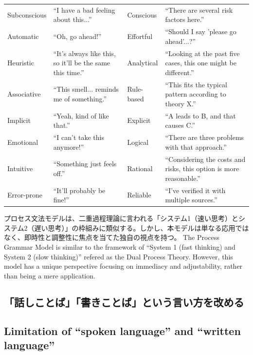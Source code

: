 \documentclass[a4paper]{article}
\begin{document}
\begin{table}[htb]
\begin{tabular}{@{}
>{\raggedright\arraybackslash}p{20mm}
>{\raggedright\arraybackslash}p{42mm}
>{\raggedright\arraybackslash}p{20mm}
>{\raggedright\arraybackslash}p{58mm}
@{}
}
Subconscious & ``I have a bad feeling about this...'' &
Conscious & ``There are several risk factors here.'' \\

Automatic & ``Oh, go ahead!'' &
Effortful & ``Should I say 'please go ahead'...?'' \\

Heuristic & ``It's always like this, so it'll be the same this time.'' &
Analytical & ``Looking at the past five cases, this one might be different.'' \\

Associative & ``This smell... reminds me of something.'' &
Rule-based & ``This fits the typical pattern according to theory X.'' \\

Implicit & ``Yeah, kind of like that.'' &
Explicit & ``A leads to B, and that causes C.'' \\

Emotional & ``I can't take this anymore!'' &
Logical & ``There are three problems with that approach.'' \\

Intuitive & ``Something just feels off.'' &
Rational & ``Considering the costs and risks, this option is more reasonable.'' \\

Error-prone & ``It'll probably be fine!'' &
Reliable & ``I've verified it with multiple sources.'' \\
\end{tabular}
\fi
\end{table}

\ifJPN
プロセス文法モデルは、二重過程理論に言われる「システム1（速い思考）とシステム2（遅い思考）」の枠組みに類似する。しかし、本モデルは単なる応用ではなく、即時性と調整性に焦点を当てた独自の視点を持つ\autocite{Evans2008, Kahneman2011-KAHTFA-2, squire2009memory}。
\else
The Process Grammar Model is similar to the framework of ``System 1 (fast thinking) and System 2 (slow thinking)'' refered as the Dual Process Theory. However, this model has a unique perspective focusing on immediacy and adjustability, rather than being a mere application.\autocite{Evans2008, Kahneman2011-KAHTFA-2, squire2009memory}
\fi

\ifJPN
  \subsection{「話しことば」「書きことば」という言い方を改める}
\else
  \subsection{Limitation of ``spoken language'' and ``written language''}
\fi
\end{document}
